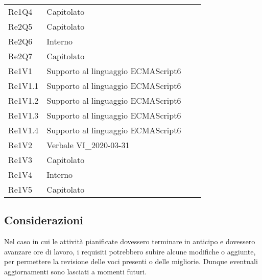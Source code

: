 \begin{longtable}{C{3cm} C{3cm} L{5.5cm} C{3cm}}
Re1Q4 & Capitolato\\
Re2Q5 & Capitolato\\
Re2Q6 & Interno\\
Re2Q7 & Capitolato\\
Re1V1 & Supporto al linguaggio ECMAScript6\\
Re1V1.1 & Supporto al linguaggio ECMAScript6\\
Re1V1.2 & Supporto al linguaggio ECMAScript6\\
Re1V1.3 & Supporto al linguaggio ECMAScript6\\
Re1V1.4 & Supporto al linguaggio ECMAScript6\\
Re1V2 & Verbale VI\_2020-03-31\\
Re1V3 & Capitolato\\
Re1V4 & Interno\\
Re1V5 & Capitolato\\
\end{longtable}
	

	\subsection{Considerazioni}
Nel caso in cui le attività pianificate dovessero terminare in anticipo e dovessero avanzare ore di lavoro, i requisiti potrebbero subire alcune modifiche o aggiunte, per permettere la revisione delle voci presenti o delle migliorie. Dunque eventuali aggiornamenti sono lasciati a momenti
futuri.


